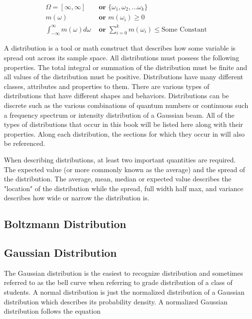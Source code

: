 \documentclass[11pt,a4paper]{book}
\begin{document}
		\begin{equation}
		\begin{split}
		\Omega = [\infty, \infty] &\textbf{ or } \{ \omega_1, \omega_2, ... \omega_k \} \\
		m(\omega) &\textbf{ or } m(\omega_i)  \geq 0 \\
		\int_{-\infty}^{\infty}{m(\omega)}d\omega &\textbf{ or } \sum_{i=0}^{k}m(\omega_i) \leq \text{Some Constant}
		\end{split}
		\end{equation}
		
		
		 
		A distribution is a tool or math construct that describes how some variable is spread out across its sample space. All distributions must possess the following properties. The total integral or summation of the distribution must be finite and all values of the distribution must be positive. Distributions have many different classes, attributes and properties to them.  There are various types of distributions that have different shapes and behaviors. Distributions can be discrete such as the various combinations of quantum numbers or continuous such a frequency spectrum or intensity distribution of a Gaussian beam. All of the types of distributions that occur in this book will be listed here along with their properties. Along each distribution, the sections for which they occur in will also be referenced.
		
		When describing distributions, at least two important quantities are required. The expected value (or more commonly known as the average) and the spread of the distribution. The average, mean, median or expected value describes the "location" of the distribution while the spread, full width half max, and variance describes how wide or narrow the distribution is. 
	
		\subsection{Boltzmann Distribution}
		
		\subsection{Gaussian Distribution}
			\label{subsec:Gaussian Distribution}
			The Gaussian distribution is the easiest to recognize distribution and sometimes referred to as the bell curve when referring to grade distribution of a class of students. A normal distribution is just the normalized distribution of a Gaussian distribution which describes its probability density. A normalized Gaussian distribution follows the equation
			
\end{document}
